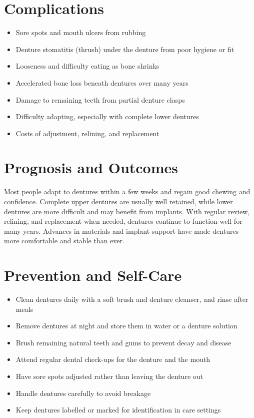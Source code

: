 \section*{Complications}
\begin{itemize}
    \item Sore spots and mouth ulcers from rubbing
    \item Denture stomatitis (thrush) under the denture from poor hygiene or fit
    \item Looseness and difficulty eating as bone shrinks
    \item Accelerated bone loss beneath dentures over many years
    \item Damage to remaining teeth from partial denture clasps
    \item Difficulty adapting, especially with complete lower dentures
    \item Costs of adjustment, relining, and replacement
\end{itemize}

\section*{Prognosis and Outcomes}
Most people adapt to dentures within a few weeks and regain good chewing and confidence. Complete upper dentures are usually well retained, while lower dentures are more difficult and may benefit from implants. With regular review, relining, and replacement when needed, dentures continue to function well for many years. Advances in materials and implant support have made dentures more comfortable and stable than ever.

\section*{Prevention and Self-Care}
\begin{itemize}
    \item Clean dentures daily with a soft brush and denture cleanser, and rinse after meals
    \item Remove dentures at night and store them in water or a denture solution
    \item Brush remaining natural teeth and gums to prevent decay and disease
    \item Attend regular dental check-ups for the denture and the mouth
    \item Have sore spots adjusted rather than leaving the denture out
    \item Handle dentures carefully to avoid breakage
    \item Keep dentures labelled or marked for identification in care settings
\end{itemize}

